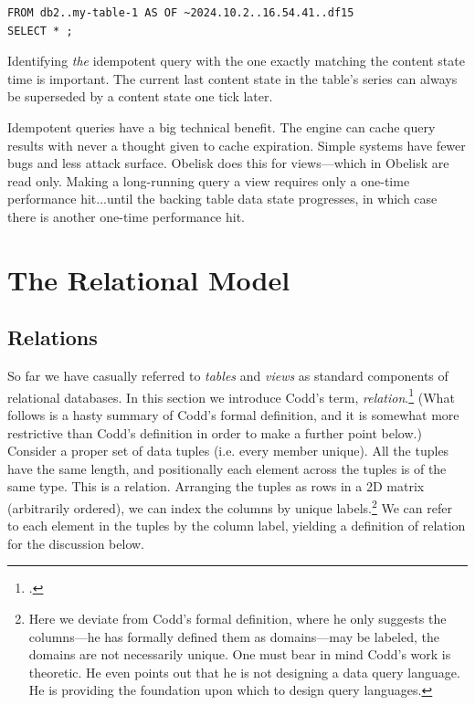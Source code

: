 \documentclass[twoside]{article}
\begin{document}
\begin{lstlisting}[style=listingcode_sql]
FROM db2..my-table-1 AS OF ~2024.10.2..16.54.41..df15
SELECT * ;
\end{lstlisting}

\noindent
Identifying \emph{the} idempotent query with the one exactly matching the content state time is important. The current last content state in the table's series can always be superseded by a content state one tick later.

Idempotent queries have a big technical benefit. The engine can cache query results with never a thought given to cache expiration. Simple systems have fewer bugs and less attack surface. Obelisk does this for views---which in Obelisk are read only. Making a long-running query a view requires only a one-time performance hit...until the backing table data state progresses, in which case there is another one-time performance hit.

\section{The Relational Model}

\subsection{Relations}

\sloppy
So far we have casually referred  to \emph{tables} and \emph{views} as standard components of relational databases. In this section we introduce Codd's term, \emph{relation}.\footnote{\citet{Codd1970}.} (What follows is a hasty summary of Codd's formal definition, and it is somewhat more restrictive than Codd's definition in order to make a further point below.) Consider a proper set of data tuples (i.e. every member unique). All the tuples have the same length, and positionally each element across the tuples is of the same type. This is a \mbox{relation}. Arranging the tuples as rows in a 2D matrix (arbitrarily ordered), we can index the columns by unique labels.\footnote{Here we deviate from Codd's formal definition, where he only suggests the columns---he has formally defined them as domains---may be labeled, the domains are not necessarily unique. One must bear in mind Codd's work is theoretic. He even points out that he is not designing a data query language. He is providing the foundation upon which to design query languages.} We can refer to each element in the tuples by the column label, yielding a definition of relation for the discussion below.
\end{document}

